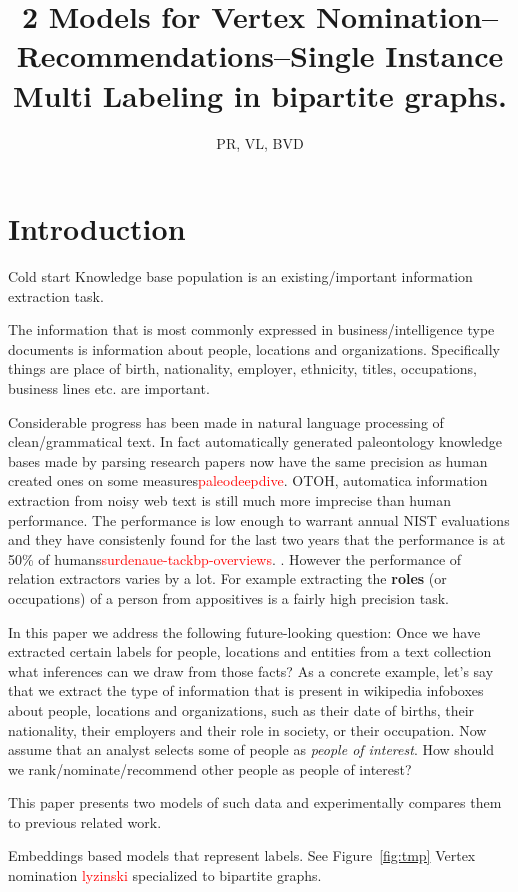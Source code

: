 \documentclass{tufte-handout}
\title{2 Models for Vertex Nomination--Recommendations--Single Instance Multi
  Labeling in bipartite graphs.}
\author{PR, VL, BVD}
\renewcommand{\cite}[1]{\textcolor{red}{#1}}
\newcommand{\figref}[1]{Figure~\ref{#1}}
\begin{document}
\maketitle
\section{Introduction}
\label{sec:introduction}
Cold start Knowledge base population is an existing/important information extraction task. 

The information that is most commonly expressed in business/intelligence type documents is 
information about people, locations and organizations. Specifically things are place of birth,
nationality, employer, ethnicity, titles, occupations, business lines etc. are important. 

Considerable progress has been made in natural language processing of clean/grammatical text.
In fact automatically generated paleontology knowledge
bases made by parsing research papers now have the same precision as human created ones on some measures\cite{paleodeepdive}.
OTOH, automatica information extraction from noisy web text is still much more imprecise than human performance.
The performance is low enough to warrant annual NIST evaluations and they have consistenly found for the last two years
that the performance is at 50\% of humans\cite{surdenaue-tackbp-overviews}. 
. However the performance of relation extractors varies by a lot.
For example extracting the \textbf{roles} (or occupations) of a person from appositives is a fairly 
high precision task.

In this paper we address the following future-looking question: Once we have extracted certain 
labels for people, locations and entities from a text collection what inferences can we draw from 
those facts? As a concrete example, let's say that we extract the type of information that is present 
in wikipedia infoboxes about people, locations and organizations, such as their date of births, their 
nationality, their employers and their role in society, or their occupation. Now assume that 
an analyst selects some of people as \textit{people of interest}. How should we rank/nominate/recommend 
other people as people of interest?

This paper presents two models of such data and experimentally compares them to previous related work.

 Embeddings based models that represent labels. See \figref{fig:tmp}
 Vertex nomination \cite{lyzinski} specialized to bipartite
graphs.
\end{document}
